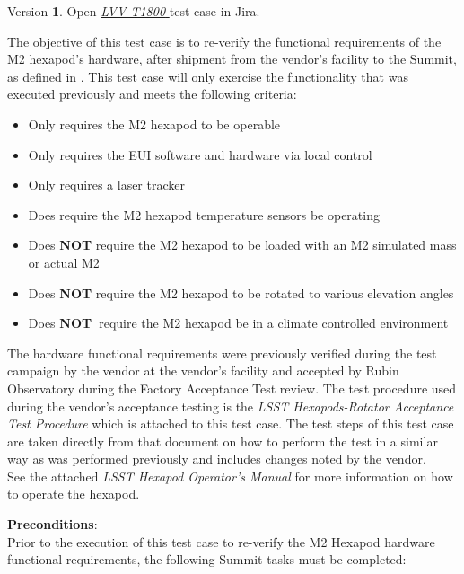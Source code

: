 \documentclass[SE,lsstdraft,STR,toc]{lsstdoc}
\providecommand{\tightlist}{
  \setlength{\itemsep}{0pt}\setlength{\parskip}{0pt}}
\begin{document}
Version \textbf{1}.
Open  \href{https://jira.lsstcorp.org/secure/Tests.jspa#/testCase/LVV-T1800}{\textit{ LVV-T1800 } }
test case in Jira.

The objective of this test case is to re-verify the functional
requirements of the M2 hexapod's hardware, after shipment from the
vendor's facility to the Summit, as defined in . This test case
will only exercise the functionality that was executed previously and
meets the following criteria:

\begin{itemize}
\tightlist
\item
  Only requires the M2 hexapod to be operable
\item
  Only requires the EUI software and hardware via local control
\item
  Only requires a laser tracker
\item
  Does require the M2 hexapod temperature sensors be operating
\item
  Does \textbf{NOT} require the M2 hexapod to be loaded with an M2
  simulated mass or actual M2
\item
  Does \textbf{NOT} require the M2 hexapod to be rotated to various
  elevation angles
\item
  Does \textbf{NOT~}require the M2 hexapod be in a climate controlled
  environment
\end{itemize}

The hardware functional requirements were previously verified during the
test campaign by the vendor at the vendor's facility and accepted by
Rubin Observatory during the Factory Acceptance Test review. The test
procedure used during the vendor's acceptance testing is the \emph{LSST
Hexapods-Rotator Acceptance Test Procedure} which is attached to this
test case. The test steps of this test case are taken directly from that
document on how to perform the test in a similar way as was performed
previously and includes changes noted by the
vendor.\\[2\baselineskip]See the attached \emph{LSST Hexapod Operator's
Manual} for more information on how to operate the hexapod.

\textbf{ Preconditions}:\\
Prior to the execution of this test case to re-verify the M2 Hexapod
hardware functional requirements, the following Summit tasks must be
completed:
\end{document}
